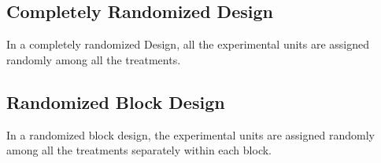 \documentclass[12pt]{article}
\begin{document}
        \subsection*{Completely Randomized Design}
            In a completely randomized Design, all the experimental units are assigned
            randomly among all the treatments.
        \subsection*{Randomized Block Design}
            In a randomized block design, the experimental units are assigned randomly
            among all the treatments separately within each block.
\end{document}
